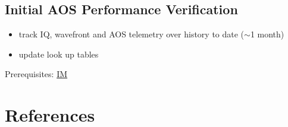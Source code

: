\documentclass[SE,authoryear,toc]{lsstdoc}
\newcommand{\IM}[1]{\hyperref[IM:#1]{\color{blue}IM$_{\text{\csname nameIM#1\endcsname}}$}}
\begin{document}
\subsection{Initial AOS Performance Verification}

\begin{itemize}
\item track IQ, wavefront and AOS telemetry over history to date ($\sim$1 month)
\item update look up tables
\end{itemize}
Prerequisites: \IM{b}

\section{References} \label{sec:bib}
\renewcommand{\refname}{} %


%
\printglossaries
\end{document}
